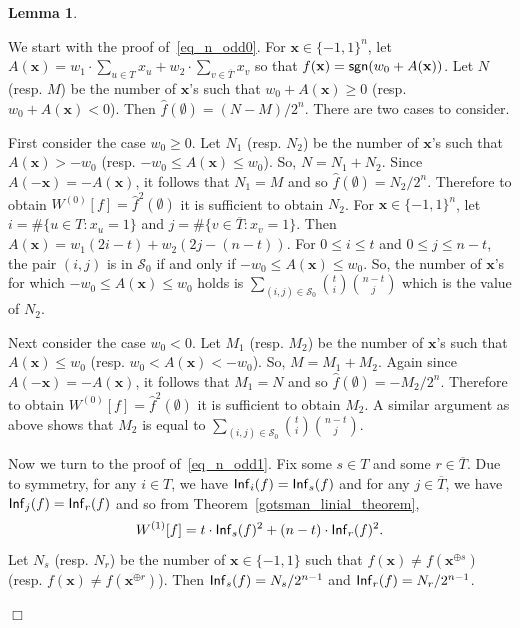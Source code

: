 \documentclass[11pt]{article}
\newtheorem{lemma} {Lemma}
\newenvironment{proof}{\noindent{\bf Proof:}\indent}%
                      {\hfill $\Box$\par}
\newcommand{\sym}[1]{{\sf #1}}
\begin{document}
\begin{lemma}
\end{lemma}

\begin{proof}
	We start with the proof of~\eqref{eq_n_odd0}.
	For $\mathbf{x}\in\{-1,1\}^n$, let $A(\mathbf{x})=w_1\cdot\sum_{u\in T}x_{u}+w_2\cdot\sum_{v\in \overline{T}}x_{v}$ so that
	$f(\mathbf{x})=\sym{sgn}(w_0+A(\mathbf{x}))$. Let $N$ (resp. $M$) be the number of $\mathbf{x}$'s such that 
	$w_0+A(\mathbf{x})\geq 0$ (resp. $w_0+A(\mathbf{x})<0$). Then $\hat{f}(\emptyset)=(N-M)/2^n$. There are two cases to consider.

	First consider the case $w_0\geq0$. Let $N_1$ (resp. $N_2$) be the number of $\mathbf{x}$'s such that 
	$A(\mathbf{x})>-w_0$ (resp. $-w_0\leq A(\mathbf{x})\leq w_0$). So, $N=N_1+N_2$. Since $A(-\mathbf{x})=-A(\mathbf{x})$, it follows that $N_1=M$ and so
	$\hat{f}(\emptyset)=N_2/2^n$. Therefore to obtain ${W}^{(0)}[f]=\hat{f}^2(\emptyset)$ it is sufficient to obtain $N_2$.
	For $\mathbf{x}\in\{-1,1\}^n$, let $i=\#\{u\in T:x_u=1\}$ and $j=\#\{v\in\overline{T}:x_v=1\}$. Then $A(\mathbf{x})=w_1(2i-t)+w_2(2j-(n-t))$. 
	For $0\leq i\leq t$ and $0\leq j\leq n-t$, the pair $(i,j)$ is in $\mathcal{S}_0$ if and only if $-w_0\leq A(\mathbf{x})\leq w_0$. So, the number of $\mathbf{x}$'s
	for which $-w_0\leq A(\mathbf{x})\leq w_0$ holds is $\sum_{(i,j)\in\mathcal{S}_0}{t\choose i}{n-t\choose j}$ which is the value of $N_2$.

	    Next consider the case $w_0<0$. Let $M_1$ (resp. $M_2$) be the number of $\mathbf{x}$'s such that 
	$A(\mathbf{x})\leq w_0$ (resp. $w_0< A(\mathbf{x})< -w_0$). So, $M=M_1+M_2$. Again since $A(-\mathbf{x})=-A(\mathbf{x})$, it follows that $M_1=N$ and so
	$\hat{f}(\emptyset)=-M_2/2^n$. Therefore to obtain ${W}^{(0)}[f]=\hat{f}^2(\emptyset)$ it is sufficient to obtain $M_2$. 
	A similar argument as above shows that $M_2$ is equal to $\sum_{(i,j)\in\mathcal{S}_{0}}{t \choose i}{n-t\choose j}$. 

	Now we turn to the proof of~\eqref{eq_n_odd1}. 
	Fix some $s\in T$ and some $r\in \overline{T}$. Due to symmetry, for any $i\in T$, we have $\sym{Inf}_i(f)=\sym{Inf}_s(f)$ and for any $j\in \overline{T}$, 
	we have $\sym{Inf}_j(f)=\sym{Inf}_r(f)$ and so from Theorem~\ref{gotsman_linial_theorem}, 
\begin{equation}\label{local_eq}
	{W}^{(1)}[f]=t\cdot \sym{Inf}_{s}(f)^2 + (n-t)\cdot \sym{Inf}_{r}(f)^2.
\end{equation}
	Let $N_s$ (resp. $N_r$) be the number of $\mathbf{x}\in \{-1,1\}$ such that $f(\mathbf{x})\neq f(\mathbf{x}^{\oplus s})$ (resp.
	$f(\mathbf{x})\neq f(\mathbf{x}^{\oplus r})$). Then $\sym{Inf}_s(f)=N_s/2^{n-1}$ and $\sym{Inf}_r(f)=N_r/2^{n-1}$. 
	

\end{proof}
\end{document}
